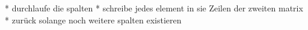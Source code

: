 \documentclass[12pt,a4paper,ngerman]{scrreprt}
\begin{document}
\begin{enumerate}
\begin{enumerate}
* durchlaufe die spalten
  * schreibe jedes element in sie Zeilen der zweiten matrix
* zurück solange noch weitere spalten existieren

\begin{comment}
\begin{flushleft}
\begin{struktogramm}(95,40)[Programmname]
\while{\( test \)}test
\whileend
\case[10]{3}{3}{Signum(x)}{-1}
	\assign{\(z \gets - \frac{1}{x}\)}
\switch{0}
	\assign{Ausgabe: Division durch 0}
\switch[r]{1}
	\assign{\(z \gets \frac{1}{x}\)}
\caseend
\end{struktogramm}
\end{flushleft}
\end{comment}


\end{enumerate}

\end{enumerate}
\end{document}
